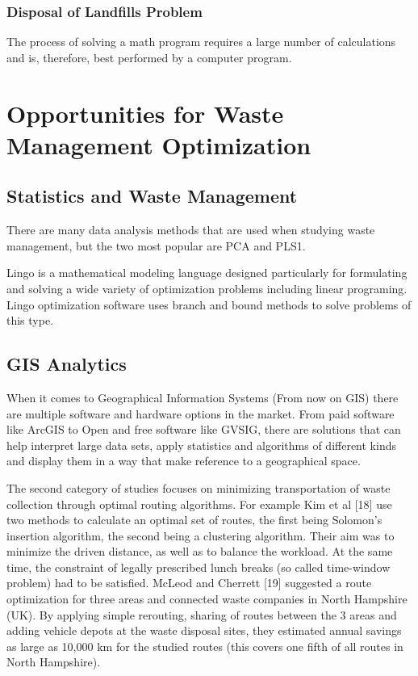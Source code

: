 \documentclass[sigconf]{acmart}
\begin{document}
\subsubsection{Disposal of Landfills Problem}

The process of solving a math program requires a large number of calculations and is, therefore, best performed by a computer program. ~\cite{akbarpour2016}


\section{Opportunities for Waste Management Optimization}





\subsection{Statistics and Waste Management}

There are many data analysis methods that are used when studying waste management, but the two most popular are PCA and PLS1. 
~\cite{bohm2013}

Lingo is a mathematical modeling language designed particularly for formulating and solving a wide variety of optimization problems including linear programing. Lingo optimization software uses branch and bound methods to solve problems of this type. ~\cite{akbarpour2016}

\subsection{GIS Analytics}

When it comes to Geographical Information Systems (From now on GIS) there are multiple software and hardware options in the market. From paid software like ArcGIS to Open and free software like GVSIG, there are solutions that can help interpret large data sets, apply statistics and algorithms of different kinds and display them in a way that make reference to a geographical space. %


The second category of studies focuses on minimizing transportation of waste collection through optimal routing algorithms. For example Kim et al [18] use two methods to calculate an optimal set of routes, the first being Solomon's insertion algorithm, the second being a clustering algorithm. Their aim was to minimize the driven distance, as well as to balance the workload. At the same time, the constraint of legally prescribed lunch breaks (so called time-window problem) had to be satisfied. McLeod and Cherrett [19] suggested a route optimization for three areas and connected waste companies in North Hampshire (UK). By applying simple rerouting, sharing of routes between the 3 areas and adding vehicle depots at the waste disposal sites, they estimated annual savings as large as 10,000 km for the studied routes (this covers one fifth of all routes in North Hampshire). 
\end{document}
